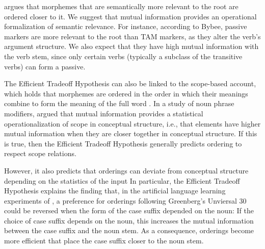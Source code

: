 \documentclass[11pt,letterpaper]{article}
\newcommand{\citep}{\parencite}
\newcommand{\citet}{\Textcite}
\newcommand\mhahn[1]{{\color{red}(#1)}}
\begin{document}

\citet{bybee-morphology-1985} argues that morphemes that are semantically more relevant to the root are ordered closer to it.
We suggest that mutual information provides an operational formalization of semantic relevance.
For instance, according to Bybee, passive markers are more relevant to the root than TAM markers, as they alter the verb's argument structure.
We also expect that they have high mutual information with the verb stem, since only certain verbs (typically a subclass of the transitive verbs) can form a passive.



The Efficient Tradeoff Hypothesis can also be linked to the scope-based account, which holds that morphemes are ordered in the order in which their meanings combine to form the meaning of the full word \citep{rice2000morpheme}.
In a study of noun phrase modifiers, \citet{culbertson2020from} argued that mutual information provides a statistical operationalization of scope in conceptual structure, i.e., that elements have higher mutual information when they are closer together in conceptual structure.
If this is true, then the Efficient Tradeoff Hypothesis generally predicts ordering to respect scope relations.

However, it also predicts that orderings can deviate from conceptual structure depending on the statistics of the input
In particular, the Efficient Tradeoff Hypothesis explains the finding that, in the artificial language learning experiments of \citet{saldana2021cross}, a preference for orderings following Greenberg's Unviersal 30 could be reversed when the form of the case suffix depended on the noun:
If the choice of case suffix depends on the noun, this increases the mutual information between the case suffix and the noun stem.
As a consequence, orderings become more efficient that place the case suffix closer to the noun stem.

\end{document}
